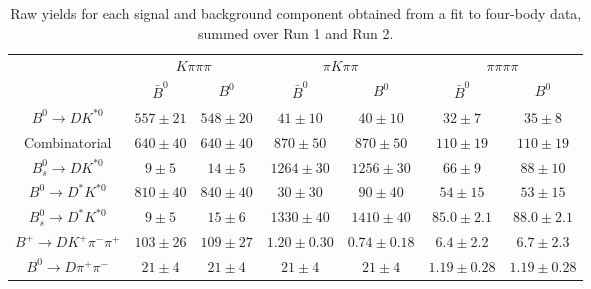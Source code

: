 \begin{table}
  \centering
  \begin{tabular}{ccccccc}
      \toprule
       & \multicolumn{2}{c}{$K\pi\pi\pi$} & \multicolumn{2}{c}{$\pi K\pi\pi$} & \multicolumn{2}{c}{$\pi\pi\pi\pi$} \\
      & $\bar{B}^0$ & $B^0$& $\bar{B}^0$ & $B^0$& $\bar{B}^0$ & $B^0$ \\
      \midrule
      $B^0 \to DK^{*0}$ & $557 \pm 21$ & $548 \pm 20$ & $41 \pm 10$ & $40 \pm 10$ & $32 \pm 7$ & $35 \pm 8$ \\
      Combinatorial & $640 \pm 40$ & $640 \pm 40$ & $870 \pm 50$ & $870 \pm 50$ & $110 \pm 19$ & $110 \pm 19$ \\
      $B^0_s \to DK^{*0}$ & $9 \pm 5$ & $14 \pm 5$ & $1264 \pm 30$ & $1256 \pm 30$ & $66 \pm 9$ & $88 \pm 10$ \\
      $B^0 \to D^*K^{*0}$ & $810 \pm 40$ & $840 \pm 40$ & $30 \pm 30$ & $90 \pm 40$ & $54 \pm 15$ & $53 \pm 15$ \\
      $B^0_s \to D^*K^{*0}$ & $9 \pm 5$ & $15 \pm 6$ & $1330 \pm 40$ & $1410 \pm 40$ & $85.0 \pm 2.1$ & $88.0 \pm 2.1$ \\
      $B^+ \to DK^+\pi^-\pi^+$ & $103 \pm 26$ & $109 \pm 27$ & $1.20 \pm 0.30$ & $0.74 \pm 0.18$ & $6.4 \pm 2.2$ & $6.7 \pm 2.3$ \\
      $B^0 \to D\pi^+\pi^-$ & $21 \pm 4$ & $21 \pm 4$ & $21 \pm 4$ & $21 \pm 4$ & $1.19 \pm 0.28$ & $1.19 \pm 0.28$ \\
      \bottomrule
      \end{tabular}
  \caption{Raw yields for each signal and background component obtained from a fit to four-body data, summed over Run 1 and Run 2.}
\label{tab:yields_split_4body}
\end{table}
